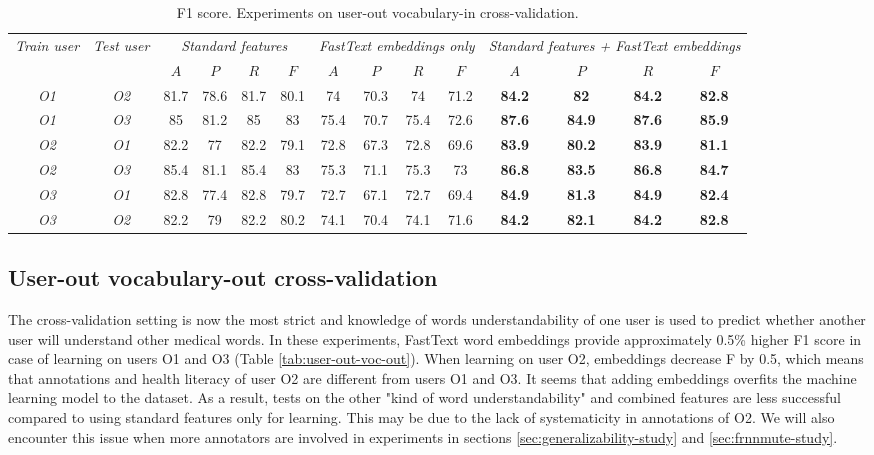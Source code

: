 \begin{table}[h]
\begin{tabular}{cc|cccc|cccc|cccc}
\multirow{2}{0.6cm}{\textit{Train user}} & \multirow{2}{0.6cm}{\textit{Test user}} & \multicolumn{4}{c|}{\textit{Standard features}} & \multicolumn{4}{c|}{\textit{FastText embeddings only}} & \multicolumn{4}{X}{\textit{Standard features + FastText embeddings}} \\ \cline{3-14} 
 &  & $A$ & $P$ & $R$ & $F$ & $A$ & $P$ & $R$ & $F$ & $A$ & $P$ & $R$ & $F$ \\ \hline
\textit{O1} & \textit{O2} & 81.7 & 78.6 & 81.7 & 80.1 & 74 & 70.3 & 74 & 71.2 & \textbf{84.2} & \textbf{82} & \textbf{84.2} & \textbf{82.8} \\  
\textit{O1} & \textit{O3} & 85 & 81.2 & 85 & 83 & 75.4 & 70.7 & 75.4 & 72.6 & \textbf{87.6} & \textbf{84.9} & \textbf{87.6} & \textbf{85.9} \\ \hline 
\textit{O2} & \textit{O1} & 82.2 & 77 & 82.2 & 79.1 & 72.8 & 67.3 & 72.8 & 69.6 & \textbf{83.9} & \textbf{80.2} & \textbf{83.9} & \textbf{81.1} \\  
\textit{O2} & \textit{O3} & 85.4 & 81.1 & 85.4 & 83 & 75.3 & 71.1 & 75.3 & 73 & \textbf{86.8} & \textbf{83.5} & \textbf{86.8} & \textbf{84.7} \\ \hline 
\textit{O3} & \textit{O1} & 82.8 & 77.4 & 82.8 & 79.7 & 72.7 & 67.1 & 72.7 & 69.4 & \textbf{84.9} & \textbf{81.3} & \textbf{84.9} & \textbf{82.4} \\  
\textit{O3} & \textit{O2} & 82.2 & 79 & 82.2 & 80.2 & 74.1 & 70.4 & 74.1 & 71.6 & \textbf{84.2} & \textbf{82.1} & \textbf{84.2} & \textbf{82.8} \\ \hline 
\end{tabular}
    \caption{F1 score. Experiments on user-out vocabulary-in cross-validation.}
    \label{tab:user-out-voc-in}
\end{table}


\subsection{User-out vocabulary-out cross-validation}
\label{sec:user-out-voc-out}

The cross-validation setting is now the most strict and knowledge of words understandability of one user is used to predict whether another user will understand other medical words. In these experiments, FastText word embeddings provide approximately 0.5\% higher F1 score in case of learning on users O1 and O3 (Table \ref{tab:user-out-voc-out}). When learning on user O2, embeddings decrease F by 0.5, which means that annotations and health literacy of user O2 are different from users O1 and O3. It seems that adding embeddings overfits the machine learning model to the dataset. As a result, tests on the other "kind of word understandability" and combined features are less successful compared to using standard features only for learning. This may be due to the lack of systematicity in annotations of O2. We will also encounter this issue when more annotators are involved in experiments in sections \ref{sec:generalizability-study} and \ref{sec:frnnmute-study}.

